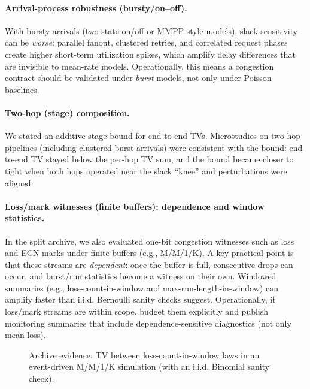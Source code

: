 \documentclass[11pt]{article}
\theoremstyle{definition}
\theoremstyle{remark}
\begin{document}
\paragraph{Arrival-process robustness (bursty/on--off).}
With bursty arrivals (two-state on/off or MMPP-style models), slack sensitivity can be \emph{worse}:
parallel fanout, clustered retries, and correlated request phases create higher short-term utilization spikes, which amplify delay differences that are invisible to mean-rate models.
Operationally, this means a congestion contract should be validated under \emph{burst} models, not only under Poisson baselines.

\paragraph{Two-hop (stage) composition.}
We stated an additive stage bound for end-to-end TVs.
Microstudies on two-hop pipelines (including clustered-burst arrivals) were consistent with the bound:
end-to-end TV stayed below the per-hop TV sum, and the bound became closer to tight when both hops operated near the slack ``knee'' and perturbations were aligned.

\paragraph{Loss/mark witnesses (finite buffers): dependence and window statistics.}
In the split archive, we also evaluated one-bit congestion witnesses such as loss and ECN marks under finite buffers (e.g., M/M/1/K).
A key practical point is that these streams are \emph{dependent}: once the buffer is full, consecutive drops can occur, and burst/run statistics become a witness on their own.
Windowed summaries (e.g., loss-count-in-window and max-run-length-in-window) can amplify faster than i.i.d. Bernoulli sanity checks suggest.
Operationally, if loss/mark streams are within scope, budget them explicitly and publish monitoring summaries that include dependence-sensitive diagnostics (not only mean loss).


\begin{figure}[t]
\centering
{}
\caption{Archive evidence: TV between loss-count-in-window laws in an event-driven M/M/1/K simulation (with an i.i.d. Binomial sanity check).}
\label{fig:mm1kwindow}
\end{figure}
\end{document}
